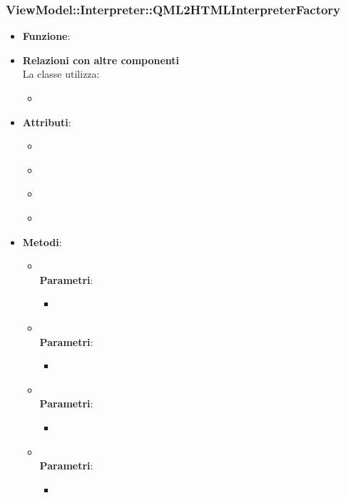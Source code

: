 \subsubsection{ViewModel::Interpreter::QML2HTMLInterpreterFactory}
\begin{itemize}
\item\textbf{Funzione}:
\item\textbf{Relazioni con altre componenti}\\
La classe utilizza:
	\begin{itemize}
		\item
	\end{itemize}
\item\textbf{Attributi}:
	\begin{itemize}
		\item\code{}\\
		\item\code{}\\
		\item\code{}\\
		\item\code{}\\
	\end{itemize}
\item\textbf{Metodi}:
	\begin{itemize}
		\item\code{}\\
		\textbf{Parametri}:
			\begin{itemize}
				\item\code{}\\
			\end{itemize}
		\item\code{}\\
		\textbf{Parametri}:
			\begin{itemize}
				\item\code{}\\
			\end{itemize}
		\item\code{}\\
		\textbf{Parametri}:
			\begin{itemize}
				\item\code{}\\
			\end{itemize}
		\item\code{}\\
		\textbf{Parametri}:
			\begin{itemize}
				\item\code{}\\
			\end{itemize}
	\end{itemize}
\end{itemize}


